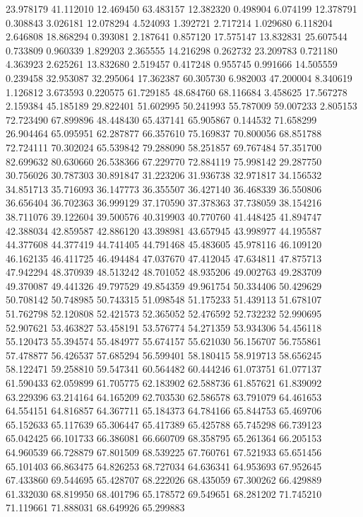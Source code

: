 23.978179
41.112010
12.469450
63.483157
12.382320
0.498904
6.074199
12.378791
0.308843
3.026181
12.078294
4.524093
1.392721
2.717214
1.029680
6.118204
2.646808
18.868294
0.393081
2.187641
0.857120
17.575147
13.832831
25.607544
0.733809
0.960339
1.829203
2.365555
14.216298
0.262732
23.209783
0.721180
4.363923
2.625261
13.832680
2.519457
0.417248
0.955745
0.991666
14.505559
0.239458
32.953087
32.295064
17.362387
60.305730
6.982003
47.200004
8.340619
1.126812
3.673593
0.220575
61.729185
48.684760
68.116684
3.458625
17.567278
2.159384
45.185189
29.822401
51.602995
50.241993
55.787009
59.007233
2.805153
72.723490
67.899896
48.448430
65.437141
65.905867
0.144532
71.658299
26.904464
65.095951
62.287877
66.357610
75.169837
70.800056
68.851788
72.724111
70.302024
65.539842
79.288090
58.251857
69.767484
57.351700
82.699632
80.630660
26.538366
67.229770
72.884119
75.998142
29.287750
30.756026
30.787303
30.891847
31.223206
31.936738
32.971817
34.156532
34.851713
35.716093
36.147773
36.355507
36.427140
36.468339
36.550806
36.656404
36.702363
36.999129
37.170590
37.378363
37.738059
38.154216
38.711076
39.122604
39.500576
40.319903
40.770760
41.448425
41.894747
42.388034
42.859587
42.886120
43.398981
43.657945
43.998977
44.195587
44.377608
44.377419
44.741405
44.791468
45.483605
45.978116
46.109120
46.162135
46.411725
46.494484
47.037670
47.412045
47.634811
47.875713
47.942294
48.370939
48.513242
48.701052
48.935206
49.002763
49.283709
49.370087
49.441326
49.797529
49.854359
49.961754
50.334406
50.429629
50.708142
50.748985
50.743315
51.098548
51.175233
51.439113
51.678107
51.762798
52.120808
52.421573
52.365052
52.476592
52.732232
52.990695
52.907621
53.463827
53.458191
53.576774
54.271359
53.934306
54.456118
55.120473
55.394574
55.484977
55.674157
55.621030
56.156707
56.755861
57.478877
56.426537
57.685294
56.599401
58.180415
58.919713
58.656245
58.122471
59.258810
59.547341
60.564482
60.444246
61.073751
61.077137
61.590433
62.059899
61.705775
62.183902
62.588736
61.857621
61.839092
63.229396
63.214164
64.165209
62.703530
62.586578
63.791079
64.461653
64.554151
64.816857
64.367711
65.184373
64.784166
65.844753
65.469706
65.152633
65.117639
65.306447
65.417389
65.425788
65.745298
66.739123
65.042425
66.101733
66.386081
66.660709
68.358795
65.261364
66.205153
64.960539
66.728879
67.801509
68.539225
67.760761
67.521933
65.651456
65.101403
66.863475
64.826253
68.727034
64.636341
64.953693
67.952645
67.433860
69.544695
65.428707
68.222026
68.435059
67.300262
66.429889
61.332030
68.819950
68.401796
65.178572
69.549651
68.281202
71.745210
71.119661
71.888031
68.649926
65.299883
